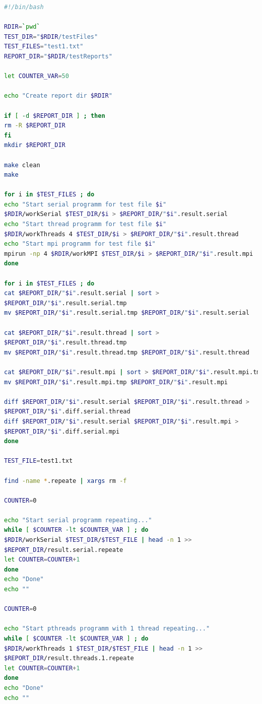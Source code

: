\documentclass[12pt,a4paper]{report}
\begin{document}
				\begin{lstlisting}[language=bash,caption={bash version},texcl=true,
				frame=single,
				breaklines=true,
				extendedchars=\true]
#!/bin/bash
	
RDIR=`pwd`
TEST_DIR="$RDIR/testFiles"
TEST_FILES="test1.txt"
REPORT_DIR="$RDIR/testReports"

let COUNTER_VAR=50
			
echo "Create report dir $RDIR"
	
if [ -d $REPORT_DIR ] ; then
rm -R $REPORT_DIR
fi
mkdir $REPORT_DIR
			
make clean
make
			
for i in $TEST_FILES ; do
echo "Start serial programm for test file $i"
$RDIR/workSerial $TEST_DIR/$i > $REPORT_DIR/"$i".result.serial
echo "Start thread programm for test file $i"
$RDIR/workThreads 4 $TEST_DIR/$i > $REPORT_DIR/"$i".result.thread
echo "Start mpi programm for test file $i"
mpirun -np 4 $RDIR/workMPI $TEST_DIR/$i > $REPORT_DIR/"$i".result.mpi
done
		
for i in $TEST_FILES ; do
cat $REPORT_DIR/"$i".result.serial | sort > 
$REPORT_DIR/"$i".result.serial.tmp
mv $REPORT_DIR/"$i".result.serial.tmp $REPORT_DIR/"$i".result.serial
			
cat $REPORT_DIR/"$i".result.thread | sort > 
$REPORT_DIR/"$i".result.thread.tmp
mv $REPORT_DIR/"$i".result.thread.tmp $REPORT_DIR/"$i".result.thread
	
cat $REPORT_DIR/"$i".result.mpi | sort > $REPORT_DIR/"$i".result.mpi.tmp
mv $REPORT_DIR/"$i".result.mpi.tmp $REPORT_DIR/"$i".result.mpi
			
diff $REPORT_DIR/"$i".result.serial $REPORT_DIR/"$i".result.thread >
$REPORT_DIR/"$i".diff.serial.thread
diff $REPORT_DIR/"$i".result.serial $REPORT_DIR/"$i".result.mpi >
$REPORT_DIR/"$i".diff.serial.mpi
done
			
TEST_FILE=test1.txt
		
find -name *.repeate | xargs rm -f
			
COUNTER=0
			
echo "Start serial programm repeating..."
while [ $COUNTER -lt $COUNTER_VAR ] ; do
$RDIR/workSerial $TEST_DIR/$TEST_FILE | head -n 1 >>
$REPORT_DIR/result.serial.repeate
let COUNTER=COUNTER+1 
done
echo "Done"
echo ""
			
COUNTER=0
			
echo "Start pthreads programm with 1 thread repeating..."
while [ $COUNTER -lt $COUNTER_VAR ] ; do
$RDIR/workThreads 1 $TEST_DIR/$TEST_FILE | head -n 1 >>
$REPORT_DIR/result.threads.1.repeate
let COUNTER=COUNTER+1 
done
echo "Done"
echo ""
			

\end{lstlisting}
\end{document}

